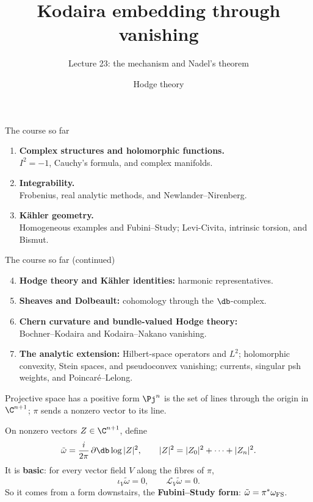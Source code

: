 
\title{Kodaira embedding through vanishing}
\subtitle{Lecture 23: the mechanism and Nadel's theorem}
\date{Hodge theory}

\begin{frame}\titlepage\end{frame}
\begin{frame}{The course so far}
\begin{enumerate}
\setlength{\itemsep}{12pt}
\item \textbf{Complex structures and holomorphic functions.}\\
\(I^2=-1\), Cauchy's formula, and complex manifolds.
\item \textbf{Integrability.}\\
Frobenius, real analytic methods, and Newlander--Nirenberg.
\item \textbf{Kähler geometry.}\\
Homogeneous examples and Fubini--Study; Levi-Civita, intrinsic torsion, and Bismut.
\end{enumerate}
\end{frame}

\begin{frame}{The course so far (continued)}
\begin{enumerate}
\setcounter{enumi}{3}
\setlength{\itemsep}{9pt}
\item \textbf{Hodge theory and Kähler identities:} harmonic representatives.
\item \textbf{Sheaves and Dolbeault:} cohomology through the \(\db\)-complex.
\item \textbf{Chern curvature and bundle-valued Hodge theory:}\\
Bochner--Kodaira and Kodaira--Nakano vanishing.
\item \textbf{The analytic extension:} Hilbert-space operators and \(L^2\);
holomorphic convexity, Stein spaces, and pseudoconvex vanishing;
currents, singular psh weights, and Poincaré--Lelong.
\end{enumerate}
\end{frame}

\begin{frame}{Projective space has a positive form}
\(\Pj^n\) is the set of lines through the origin in \(\C^{n+1}\); \(\pi\) sends a nonzero vector to its line.
\par\medskip
On nonzero vectors \(Z\in\C^{n+1}\), define
\[
\tilde\omega=\frac{i}{2\pi}\,\partial\db\log|Z|^2,\qquad |Z|^2=|Z_0|^2+\cdots+|Z_n|^2.
\]
It is \textbf{basic}: for every vector field \(V\) along the fibres of \(\pi\),
\[
\iota_V\tilde\omega=0,\qquad \mathcal L_V\tilde\omega=0.
\]
So it comes from a form downstairs, the \textbf{Fubini--Study form}: \(\tilde\omega=\pi^*\omega_{\rm FS}\).
\end{frame}

